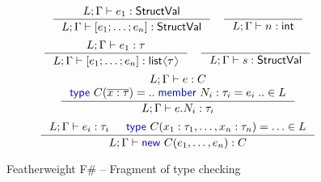 \documentclass[10pt,preprint,clearpagebib]{sigplanconf}
\newcommand{\langl}{\begin{picture}(4.5,7)
\put(1.1,2.5){\rotatebox{60}{\line(1,0){5.5}}}
\put(1.1,2.5){\rotatebox{300}{\line(1,0){5.5}}}
\end{picture}}
\newcommand{\rangl}{\begin{picture}(4.5,7)
\put(.9,2.5){\rotatebox{120}{\line(1,0){5.5}}}
\put(.9,2.5){\rotatebox{240}{\line(1,0){5.5}}}
\end{picture}}
\newcommand{\kvd}[1]{\textnormal{\textcolor{kvdclr}{\sffamily #1}}}
\newcommand{\ident}[1]{\textnormal{\sffamily #1}}
\begin{document}
\begin{figure}
\begin{equation*}
\inference
  {L; \Gamma \vdash e_1 : \ident{StructVal}}
  {L; \Gamma \vdash [e_1; \ldots; e_n]:\ident{StructVal}}
\quad  
\inference
  {~}
  {L; \Gamma \vdash n : \ident{int}}
\end{equation*}
\begin{equation*}
\inference
  {L; \Gamma \vdash e_1 : \tau}
  {L; \Gamma \vdash [e_1; \ldots; e_n]:\ident{list}\langl\tau\rangl}
\quad
\inference
  {~}
  {L; \Gamma \vdash s : \ident{StructVal}}
\end{equation*}
\vspace{0.5em}
\begin{equation*}
\inference
  {L; \Gamma \vdash e : C \\ \kvd{type}~C(\overline{x:\tau}) = ..\;\kvd{member}~N_i : \tau_i = e_i\;.. \in L}
  {L; \Gamma \vdash e.N_i:\tau_i}
\end{equation*}
\vspace{0.25em}
\begin{equation*}
\inference
  {L; \Gamma \vdash e_i : \tau_i & \kvd{type}~C(x_1:\tau_1, \ldots, x_n:\tau_n) = \ldots \in L}
  {L; \Gamma \vdash \kvd{new}~C(e_1, \ldots, e_n):C}
\end{equation*}

\caption{Featherweight F\# -- Fragment of type checking}
\label{fig:ff-typecheck}
\end{figure}

\end{document}

